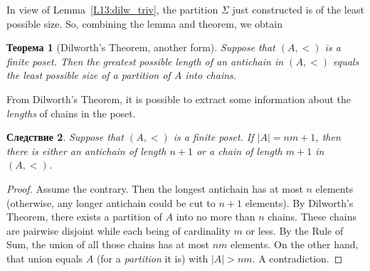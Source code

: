 \documentclass[12pt,notitlepage]{article}
\theoremstyle{plain}
\newtheorem{thm}{Теорема}[section]
\newtheorem{corr}[thm]{Следствие}
\theoremstyle{definition}
\theoremstyle{plain}
\newcommand{\1}{\mathbf{1}}
\newcommand{\0}{\mathbf{0}}
\begin{document}
In view of Lemma~\ref{L13:dilw_triv}, the partition $\Sigma$ just constructed is of the least possible size. So, combining the lemma and theorem, we obtain
\begin{thm}[Dilworth's Theorem, another form]
	Suppose that $(A, <)$ is a finite poset. Then the greatest possible length of an antichain in $(A, <)$ equals the least possible size of a partition of $A$ into chains.
\end{thm}

From Dilworth's Theorem, it is possible to extract some information about the \emph{lengths} of chains in the poset.
\begin{corr}\label{chain_size}
	Suppose that $(A, <)$ is a finite poset. If $|A| = n m + 1$, then there is either an antichain of length $n + 1$ or a chain of length $m + 1$ in $(A, <)$.
\end{corr}
\begin{proof}
	Assume the contrary. Then the longest antichain has at most $n$ elements (otherwise, any longer antichain could be cut to $n + 1$ elements). By Dilworth's Theorem, there exists a partition of $A$ into no more than $n$ chains. These chains are pairwise disjoint while each being of cardinality $m$ or less. By the Rule of Sum, the union of all those chains has at most $n m$ elements. On the other hand, that union equals $A$ (for a \emph{partition} it is) with $|A| > n m$. A contradiction.
\end{proof}
\end{document}
